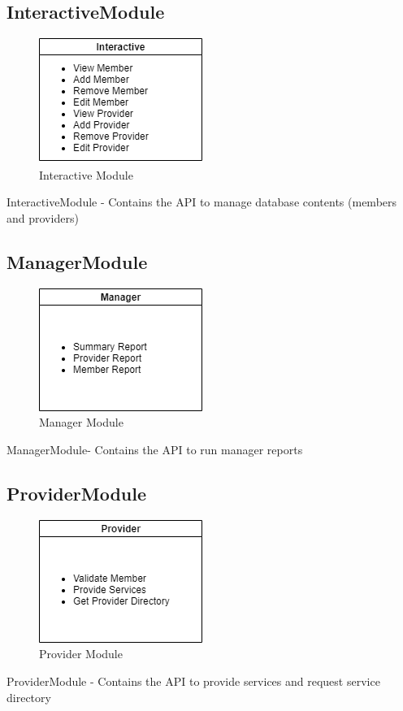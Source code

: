 \documentclass{article}
\begin{document}
\subsection{InteractiveModule}
  \begin{figure}[h!]
	\centering
	\includegraphics[width=0.3\linewidth]{interactiveModule.png}
	\caption[Interactive Module]{Interactive Module}
	\label{fig:P1compileP0-1}
  \end{figure}
InteractiveModule - Contains the API to manage database contents (members and providers)

\pagebreak
\subsection{ManagerModule}
  \begin{figure}[h!]
	\centering
	\includegraphics[width=0.3\linewidth]{managerModule.png}
	\caption[Manager Module]{Manager Module}
	\label{fig:P1compileP0-1}
  \end{figure}
ManagerModule- Contains the API to run manager reports

\subsection{ProviderModule}
  \begin{figure}[h!]
	\centering
	\includegraphics[width=0.3\linewidth]{providerModule.png}
	\caption[Provider Module]{Provider Module}
	\label{fig:P1compileP0-1}
  \end{figure}
ProviderModule - Contains the API to provide services and request service directory
\end{document}
